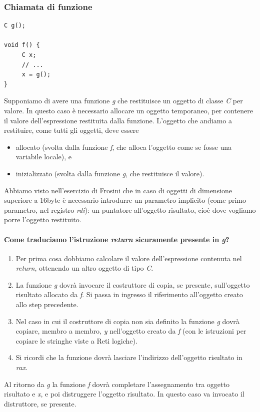 \documentclass[11pt]{report}
\theoremstyle{definition}
\begin{document}
\subsubsection{Chiamata di funzione}
\begin{verbatim}
C g();

void f() {
     C x;
     // ...
     x = g();
}
\end{verbatim}
Supponiamo di avere una funzione \emph{g} che restituisce un oggetto di classe \emph{C} per valore. In questo caso è necessario allocare un oggetto temporaneo, per contenere il valore dell'espressione restituita dalla funzione. L'oggetto che andiamo a restituire, come tutti gli oggetti, deve essere 
\begin{itemize}
\item allocato (svolta dalla funzione \emph{f}, che alloca l'oggetto come se fosse una variabile locale), e
\item inizializzato (svolta dalla funzione \emph{g},  che restituisce il valore).
\end{itemize}
Abbiamo visto nell'esercizio di Frosini che in caso di oggetti di dimensione superiore a 16byte è necessario introdurre un parametro implicito (come primo parametro, nel registro \emph{rdi}): un puntatore all'oggetto risultato, cioè dove vogliamo porre l'oggetto restituito.
\paragraph{Come traduciamo l'istruzione \emph{return} sicuramente presente in \emph{g}?} 
\begin{enumerate}
\item Per prima cosa dobbiamo calcolare il valore dell'espressione contenuta nel \emph{return}, ottenendo un altro oggetto di tipo \emph{C}.
\item La funzione \emph{g} dovrà invocare il costruttore di copia, se presente, sull'oggetto risultato allocato da \emph{f}. Si passa in ingresso il riferimento all'oggetto creato allo step precedente.
\item Nel caso in cui il costruttore di copia non sia definito la funzione \emph{g} dovrà copiare, membro a membro, \emph{y} nell'oggetto creato da \emph{f} (con le istruzioni per copiare le stringhe viste a Reti logiche).
\item Si ricordi che la funzione dovrà lasciare l'indirizzo dell'oggetto risultato in \emph{rax}.
\end{enumerate}
Al ritorno da \emph{g} la funzione \emph{f} dovrà completare l'assegnamento tra oggetto risultato e \emph{x}, e poi distruggere l'oggetto risultato. In questo caso va invocato il distruttore, se presente.
\end{document}
